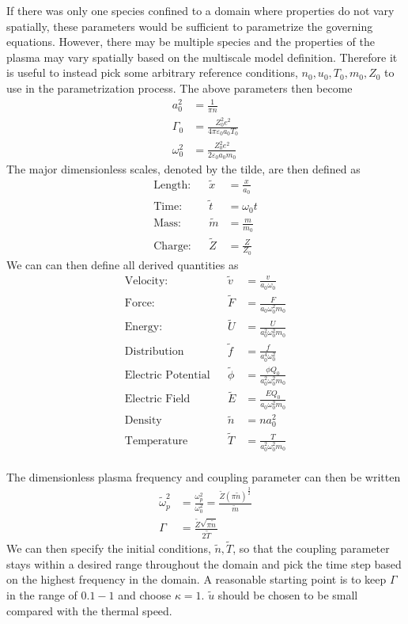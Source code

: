 \documentclass[11pt]{article}
\begin{document}
If there was only one species confined to a domain where properties do not vary spatially, these parameters would be sufficient to parametrize the governing equations. However, there may be multiple species and the properties of the plasma may vary spatially based on the multiscale model definition. Therefore it is useful to instead pick some arbitrary reference conditions, $n_0,u_0,T_0,m_0,Z_0$ to use in the parametrization process. The above parameters then become
\begin{align*}
a_0^2 		&= \frac{1}{\pi n} \\
\Gamma_0 	&= \frac{Z_0^2e^2}{4\pi\varepsilon_0a_0T_0} \\
\omega_0^2	&= \frac{Z_0^2e^2}{2\varepsilon_0a_0m_0}
\end{align*}
The major dimensionless scales, denoted by the tilde, are then defined as
\begin{align*}
\text{Length:}&		& 	\tilde{x} &= \frac{x}{a_0} 	\\
\text{Time:}&		&	\tilde{t} &= \omega_0 t 	\\
\text{Mass:}&		&	\tilde{m} &= \frac{m}{m_0} 	\\
\text{Charge:}&		&	\tilde{Z} &= \frac{Z}{Z_0}	
\end{align*}
We can can then define all derived quantities as
\begin{align*}
\text{Velocity:}&			&	\tilde{v} 	 &= \frac{v}{a_0\omega_0} 				\\
\text{Force:}&				&	\tilde{F} 	 &= \frac{F}{a_0\omega_0^2m_0}			\\
\text{Energy:}&				&	\tilde{U} 	 &= \frac{U}{a_0^2\omega_0^2m_0} 		\\
\text{Distribution}& 		&	\tilde{f} 	 &= \frac{f}{a_0^4\omega_0^2}			\\
\text{Electric Potential}&	&	\tilde{\phi} &= \frac{\phi Q_0}{a_0^2\omega_0^2m_0}	\\
\text{Electric Field}&		&	\tilde{E} 	 &= \frac{EQ_0}{a_0\omega_0^2m_0}		\\
\text{Density}&				&	\tilde{n}	 &= na_0^2								\\
\text{Temperature}&			&	\tilde{T}	 &=	\frac{T}{a_0^2\omega_0^2m_0}		\\
\end{align*}

The dimensionless plasma frequency and coupling parameter can then be written
\begin{align*}
\tilde{\omega}_p^2 	&= \frac{\omega_p^2}{\omega_0^2} = \frac{\tilde{Z}\left(\pi\tilde{n}\right)^{\frac{3}{2}}}{\tilde{m}}	\\
\Gamma 				&= \frac{\tilde{Z}\sqrt{\pi\tilde{n}}}{2\tilde{T}}
\end{align*}
We can then specify the initial conditions, $\tilde{n},\tilde{T}$, so that the coupling parameter stays within a desired range throughout the domain and pick the time step based on the highest frequency in the domain. A reasonable starting point is to keep $\Gamma$ in the range of $0.1-1$ and choose $\kappa = 1$. $\tilde{u}$ should be chosen to be small compared with the thermal speed.
\end{document}

